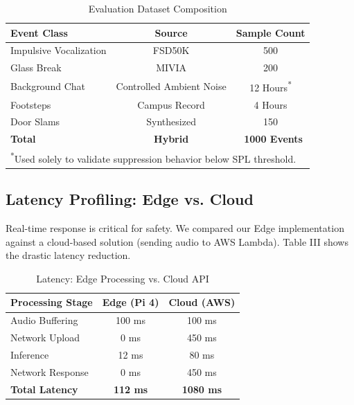 \documentclass[conference]{IEEEtran}
\begin{document}
\begin{table}[htbp]
\caption{Evaluation Dataset Composition}
\begin{center}
\begin{tabular}{lcc}
\toprule
\textbf{Event Class} & \textbf{Source} & \textbf{Sample Count} \\
\midrule
Impulsive Vocalization & FSD50K \cite{b19} & 500 \\
Glass Break & MIVIA & 200 \\
Background Chat & Controlled Ambient Noise & 12 Hours\textsuperscript{*} \\
Footsteps & Campus Record & 4 Hours \\
Door Slams & Synthesized & 150 \\
\textbf{Total} & \textbf{Hybrid} & \textbf{~1000 Events} \\
\bottomrule
\multicolumn{3}{l}{\textsuperscript{*}\footnotesize Used solely to validate suppression behavior below SPL threshold.}
\end{tabular}
\end{center}
\label{tab:dataset}
\end{table}

\subsection{Latency Profiling: Edge vs. Cloud}
Real-time response is critical for safety. We compared our Edge implementation against a cloud-based solution (sending audio to AWS Lambda). Table III shows the drastic latency reduction.

\begin{table}[htbp]
\caption{Latency: Edge Processing vs. Cloud API}
\begin{center}
\begin{tabular}{lcc}
\toprule
\textbf{Processing Stage} & \textbf{Edge (Pi 4)} & \textbf{Cloud (AWS)} \\
\midrule
Audio Buffering & 100 ms & 100 ms \\
Network Upload & 0 ms & 450 ms \\
Inference & 12 ms & 80 ms \\
Network Response & 0 ms & 450 ms \\
\textbf{Total Latency} & \textbf{112 ms} & \textbf{1080 ms} \\
\bottomrule
\end{tabular}
\end{center}
\label{tab:latency}
\end{table}
\end{document}
